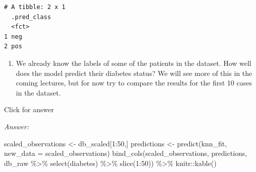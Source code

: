 \documentclass[
]{book}
\newenvironment{Shaded}{\begin{snugshade}}{\end{snugshade}}
\newcommand{\AttributeTok}[1]{\textcolor[rgb]{0.77,0.63,0.00}{#1}}
\newcommand{\DecValTok}[1]{\textcolor[rgb]{0.00,0.00,0.81}{#1}}
\newcommand{\FunctionTok}[1]{\textcolor[rgb]{0.00,0.00,0.00}{#1}}
\newcommand{\NormalTok}[1]{#1}
\newcommand{\OtherTok}[1]{\textcolor[rgb]{0.56,0.35,0.01}{#1}}
\newcommand{\SpecialCharTok}[1]{\textcolor[rgb]{0.00,0.00,0.00}{#1}}
\providecommand{\tightlist}{%
  \setlength{\itemsep}{0pt}\setlength{\parskip}{0pt}}
\begin{document}
\begin{verbatim}
# A tibble: 2 x 1
  .pred_class
  <fct>      
1 neg        
2 pos        
\end{verbatim}

\begin{enumerate}
\def\labelenumi{\alph{enumi}.}
\setcounter{enumi}{1}
\tightlist
\item
  We already know the labels of some of the patients in the dataset. How well does the model predict their diabetes status? We will see more of this in the coming lectures, but for now try to compare the results for the first 10 cases in the dataset.
\end{enumerate}

Click for answer

\emph{Answer:}

\begin{Shaded}
\begin{Highlighting}[]
\NormalTok{scaled\_observations }\OtherTok{\textless{}{-}}\NormalTok{ db\_scaled[}\DecValTok{1}\SpecialCharTok{:}\DecValTok{50}\NormalTok{,]}
\NormalTok{predictions }\OtherTok{\textless{}{-}} \FunctionTok{predict}\NormalTok{(knn\_fit, }\AttributeTok{new\_data =}\NormalTok{ scaled\_observations)}
\FunctionTok{bind\_cols}\NormalTok{(scaled\_observations, predictions, db\_raw }\SpecialCharTok{\%\textgreater{}\%} 
            \FunctionTok{select}\NormalTok{(diabetes) }\SpecialCharTok{\%\textgreater{}\%} 
            \FunctionTok{slice}\NormalTok{(}\DecValTok{1}\SpecialCharTok{:}\DecValTok{50}\NormalTok{)) }\SpecialCharTok{\%\textgreater{}\%}\NormalTok{ knitr}\SpecialCharTok{::}\FunctionTok{kable}\NormalTok{()}
\end{Highlighting}
\end{Shaded}
\end{document}
